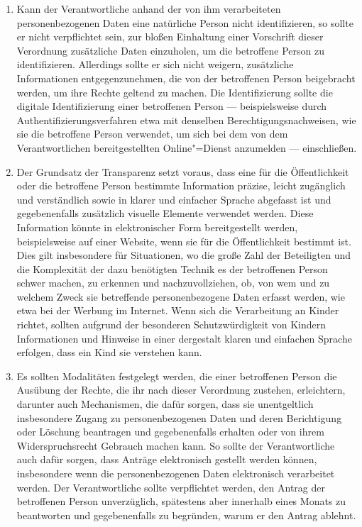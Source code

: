 \begin{enumerate}

   \item Kann der Verantwortliche anhand der von ihm verarbeiteten personenbezogenen Daten eine natürliche Person nicht
    identifizieren, so sollte er nicht verpflichtet sein, zur bloßen Einhaltung einer Vorschrift dieser Verordnung
    zusätzliche Daten einzuholen, um die betroffene Person zu identifizieren. Allerdings sollte er sich nicht weigern,
    zusätzliche Informationen entgegenzunehmen, die von der betroffenen Person beigebracht werden, um ihre Rechte
    geltend zu machen. Die Identifizierung sollte die digitale Identifizierung einer betroffenen Person —
    beispielsweise durch Authentifizierungsverfahren etwa mit denselben Berechtigungsnachweisen, wie sie die betroffene
    Person verwendet, um sich bei dem von dem Verantwortlichen bereitgestellten Online"=Dienst anzumelden —
    einschließen.%
   \label{eg:57}
   

   \item Der Grundsatz der Transparenz setzt voraus, dass eine für die Öffentlichkeit oder die betroffene Person
    bestimmte Information präzise, leicht zugänglich und verständlich sowie in klarer und einfacher Sprache abgefasst
    ist und gegebenenfalls zusätzlich visuelle Elemente verwendet werden. Diese Information könnte in elektronischer
    Form bereitgestellt werden, beispielsweise auf einer Website, wenn sie für die Öffentlichkeit bestimmt ist. Dies
    gilt insbesondere für Situationen, wo die große Zahl der Beteiligten und die Komplexität der dazu benötigten
    Technik es der betroffenen Person schwer machen, zu erkennen und nachzuvollziehen, ob, von wem und zu welchem Zweck
    sie betreffende personenbezogene Daten erfasst werden, wie etwa bei der Werbung im Internet. Wenn sich die
    Verarbeitung an Kinder richtet, sollten aufgrund der besonderen Schutzwürdigkeit von Kindern Informationen und
    Hinweise in einer dergestalt klaren und einfachen Sprache erfolgen, dass ein Kind sie verstehen kann.%
   \label{eg:58}
   

   \item Es sollten Modalitäten festgelegt werden, die einer betroffenen Person die Ausübung der Rechte, die ihr nach
    dieser Verordnung zustehen, erleichtern, darunter auch Mechanismen, die dafür sorgen, dass sie unentgeltlich
    insbesondere Zugang zu personenbezogenen Daten und deren Berichtigung oder Löschung beantragen und gegebenenfalls
    erhalten oder von ihrem Widerspruchsrecht Gebrauch machen kann. So sollte der Verantwortliche auch dafür sorgen,
    dass Anträge elektronisch gestellt werden können, insbesondere wenn die personenbezogenen Daten elektronisch
    verarbeitet werden. Der Verantwortliche sollte verpflichtet werden, den Antrag der betroffenen Person unverzüglich,
    spätestens aber innerhalb eines Monats zu beantworten und gegebenenfalls zu begründen, warum er den Antrag
    ablehnt.%
   \label{eg:59}
   

\end{enumerate}
